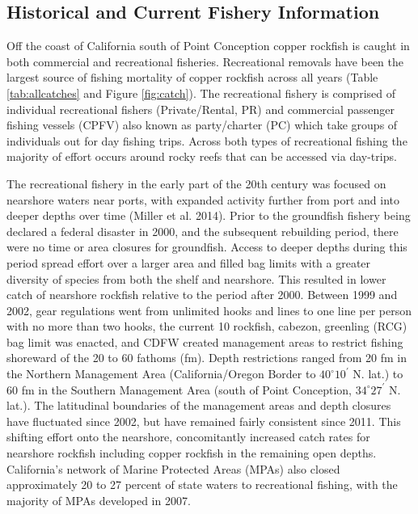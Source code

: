\documentclass[11pt,
  english,
  letterpaper,
]{article}
\begin{document}
\hypertarget{historical-and-current-fishery-information}{%
\subsection{Historical and Current Fishery Information}\label{historical-and-current-fishery-information}}

Off the coast of California south of Point Conception copper rockfish is caught in both commercial and recreational fisheries. Recreational removals have been the largest source of fishing mortality of copper rockfish across all years (Table \ref{tab:allcatches} and Figure \ref{fig:catch}). The recreational fishery is comprised of individual recreational fishers (Private/Rental, PR) and commercial passenger fishing vessels (CPFV) also known as party/charter (PC) which take groups of individuals out for day fishing trips. Across both types of recreational fishing the majority of effort occurs around rocky reefs that can be accessed via day-trips.

The recreational fishery in the early part of the 20th century was focused on nearshore waters near ports, with expanded activity further from port and into deeper depths over time (Miller et al. 2014). Prior to the groundfish fishery being declared a federal disaster in 2000, and the subsequent rebuilding period, there were no time or area closures for groundfish. Access to deeper depths during this period spread effort over a larger area and filled bag limits with a greater diversity of species from both the shelf and nearshore. This resulted in lower catch of nearshore rockfish relative to the period after 2000. Between 1999 and 2002, gear regulations went from unlimited hooks and lines to one line per person with no more than two hooks, the current 10 rockfish, cabezon, greenling (RCG) bag limit was enacted, and CDFW created management areas to restrict fishing shoreward of the 20 to 60 fathoms (fm). Depth restrictions ranged from 20 fm in the Northern Management Area (California/Oregon Border to $40^\circ 10^\prime$ N. lat.) to 60 fm in the Southern Management Area (south of Point Conception, $34^\circ 27^\prime$ N. lat.). The latitudinal boundaries of the management areas and depth closures have fluctuated since 2002, but have remained fairly consistent since 2011. This shifting effort onto the nearshore, concomitantly increased catch rates for nearshore rockfish including copper rockfish in the remaining open depths. California's network of Marine Protected Areas (MPAs) also closed approximately 20 to 27 percent of state waters to recreational fishing, with the majority of MPAs developed in 2007.
\end{document}
